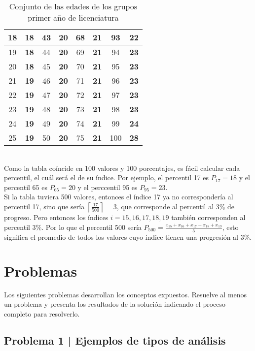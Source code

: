 \documentclass{article}
\begin{document}
\begin{table}[h!]
\begin{tabular}{|c|c|c|c|c|c|c|c|}
    18 & \textbf{18} & 43 & \textbf{20} & 68 & \textbf{21} & 93 & \textbf{22} \\ \hline
    19 & \textbf{18} & 44 & \textbf{20} & 69 & \textbf{21} & 94 & \textbf{23} \\ \hline
    20 & \textbf{18} & 45 & \textbf{20} & 70 & \textbf{21} & 95 & \textbf{23} \\ \hline
    21 & \textbf{19} & 46 & \textbf{20} & 71 & \textbf{21} & 96 & \textbf{23} \\ \hline
    22 & \textbf{19} & 47 & \textbf{20} & 72 & \textbf{21} & 97 & \textbf{23} \\ \hline
    23 & \textbf{19} & 48 & \textbf{20} & 73 & \textbf{21} & 98 & \textbf{23} \\ \hline
    24 & \textbf{19} & 49 & \textbf{20} & 74 & \textbf{21} & 99 & \textbf{24} \\ \hline
    25 & \textbf{19} & 50 & \textbf{20} & 75 & \textbf{21} & 100 & \textbf{28} \\ \hline
    \end{tabular}
    \caption{Conjunto de las edades de los grupos primer año de licenciatura}
\end{table}
\\
Como la tabla coíncide en 100 valores y 100 porcentajes, es fácil calcular cada percentil, el cuál será el de su índice. Por ejemplo, el percentil 17 es $P_{17} = 18$ y el percentil 65 es $P_{65} = 20$ y el perccentil 95 es $P_{95} = 23$.
\\[12pt]
Si la tabla tuviera 500 valores, entonces el índice 17 ya no correspondería al percentil 17, sino que sería $\left \lceil \frac{17}{500} \right \rceil = 3$, que corresponde al percentil al $3\%$ de progreso. Pero entonces los índices $i=15,16,17,18,19$ también corresponden al percentil $3\%$. Por lo que el percentil 500 sería $P_{500} = \frac{x_{15} + x_{16} + x_{17} + x_{18} + x_{19}}{5}$, esto significa el promedio de todos los valores cuyo índice tienen una progresión al $3\%$.


\section{Problemas}

Los siguientes problemas desarrollan los conceptos expuestos. Resuelve al menos un problema y presenta los resultados de la solución indicando el proceso completo para resolverlo.

\subsection{Problema 1 | Ejemplos de tipos de análisis}
\end{document}
